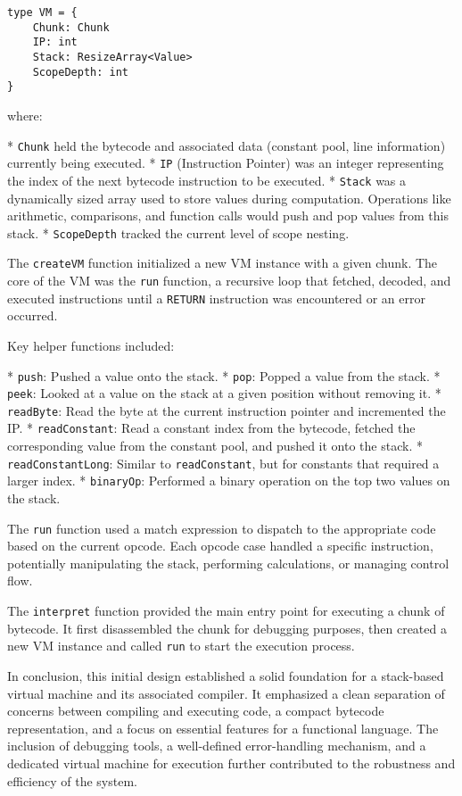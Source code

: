 \begin{verbatim}
type VM = {
    Chunk: Chunk
    IP: int
    Stack: ResizeArray<Value>
    ScopeDepth: int  
}
\end{verbatim}

\noindent where:

*   \texttt{Chunk} held the bytecode and associated data (constant pool, line information) currently being executed.
*   \texttt{IP} (Instruction Pointer) was an integer representing the index of the next bytecode instruction to be executed.
*   \texttt{Stack} was a dynamically sized array used to store values during computation. Operations like arithmetic, comparisons, and function calls would push and pop values from this stack.
*   \texttt{ScopeDepth} tracked the current level of scope nesting.

The \texttt{createVM} function initialized a new VM instance with a given chunk. The core of the VM was the \texttt{run} function, a recursive loop that fetched, decoded, and executed instructions until a \texttt{RETURN} instruction was encountered or an error occurred.

Key helper functions included:

*   \texttt{push}: Pushed a value onto the stack.
*   \texttt{pop}: Popped a value from the stack.
*   \texttt{peek}: Looked at a value on the stack at a given position without removing it.
*   \texttt{readByte}: Read the byte at the current instruction pointer and incremented the IP.
*   \texttt{readConstant}: Read a constant index from the bytecode, fetched the corresponding value from the constant pool, and pushed it onto the stack.
*   \texttt{readConstantLong}: Similar to \texttt{readConstant}, but for constants that required a larger index.
*   \texttt{binaryOp}: Performed a binary operation on the top two values on the stack.

The \texttt{run} function used a match expression to dispatch to the appropriate code based on the current opcode. Each opcode case handled a specific instruction, potentially manipulating the stack, performing calculations, or managing control flow.

The \texttt{interpret} function provided the main entry point for executing a chunk of bytecode. It first disassembled the chunk for debugging purposes, then created a new VM instance and called \texttt{run} to start the execution process.

In conclusion, this initial design established a solid foundation for a stack-based virtual machine and its associated compiler. It emphasized a clean separation of concerns between compiling and executing code, a compact bytecode representation, and a focus on essential features for a functional language. The inclusion of debugging tools, a well-defined error-handling mechanism, and a dedicated virtual machine for execution further contributed to the robustness and efficiency of the system.

